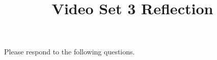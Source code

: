 \documentclass[handout]{ximera}
\title{Video Set 3 Reflection}
\begin{document}
\begin{abstract}
\end{abstract}

\maketitle

Please respond to the following questions.

\end{document}

